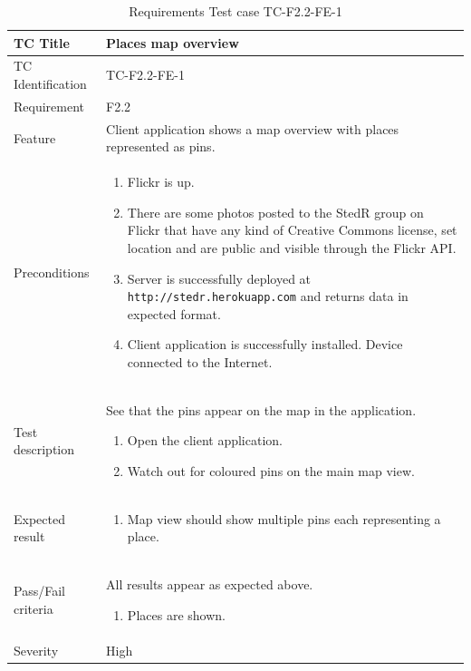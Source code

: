 \documentclass[11pt]{book}
\begin{document}
\begin{table}
  \begin{tabular}{| p{3cm} | p{9.5cm} |} \hline 
    TC Title              & Places map overview \\ \hline 
    TC Identification     & TC-F2.2-FE-1 \\ \hline 
    Requirement           & F2.2 \\ \hline 
    Feature               & Client application shows a map overview with places represented as pins. \\ \hline 
    Preconditions         & \begin{enumerate}
                              \item Flickr is up.
                              \item There are some photos posted to the StedR group on Flickr that have any kind of
                               Creative Commons license, set location and are public and visible through the Flickr API.
                              \item Server is successfully deployed at \texttt{http://stedr.herokuapp.com} and returns data in expected format.
                              \item Client application is successfully installed. Device connected to the Internet.
                            \end{enumerate} \\ \hline 

    Test description      & See that the pins appear on the map in the application.

                            \begin{enumerate}
                              \item Open the client application.
                              \item Watch out for coloured pins on the main map view.
                            \end{enumerate} \\ \hline 
    Expected result       & \begin{enumerate}
                              \item Map view should show multiple pins each representing a place.
                            \end{enumerate} \\ \hline 
    Pass/Fail criteria    & All results appear as expected above.
                            \begin{enumerate}
                              \item Places are shown.
                            \end{enumerate} \\ \hline 
    Severity              & High \\ \hline 
  \end{tabular}
  \caption{Requirements Test case TC-F2.2-FE-1}
  \label{tab:TCF2.2FE1}
\end{table}
\end{document}
